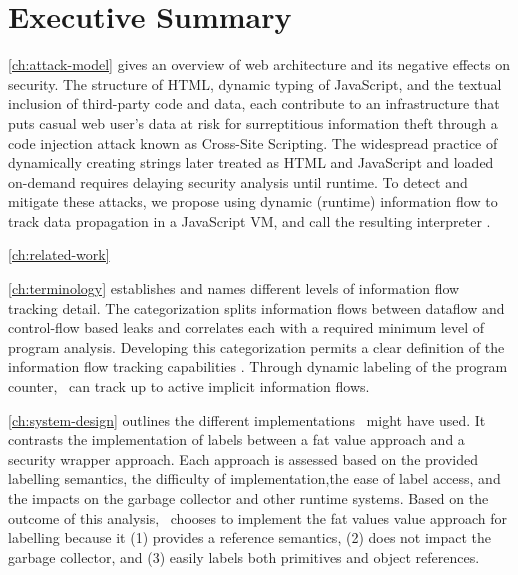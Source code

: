 \section{Executive Summary}

\autoref{ch:attack-model} gives an overview of web architecture and its negative effects on security.
The structure of HTML, dynamic typing of JavaScript, and the textual inclusion of third-party code and data, each contribute to an infrastructure that puts casual web user's data at risk for surreptitious information theft through a code injection attack known as Cross-Site Scripting.
The widespread practice of dynamically creating strings later treated as HTML and JavaScript and loaded on-demand requires delaying security analysis until runtime.
To detect and mitigate these attacks, we propose using dynamic (runtime) information flow to track data propagation in a JavaScript VM, and call the resulting interpreter \FlowCore.

\autoref{ch:related-work} 

\autoref{ch:terminology} establishes and names different levels of information flow tracking detail.
The categorization splits information flows between dataflow and control-flow based leaks and correlates each with a required minimum level of program analysis.
Developing this categorization permits a clear definition of the information flow tracking capabilities \FlowCore.
Through dynamic labeling of the program counter, \FlowCore\ can track up to active implicit information flows.

\autoref{ch:system-design} outlines the different implementations \FlowCore\ might have used.
It contrasts the implementation of labels between a fat value approach and a security wrapper approach.
Each approach is assessed based on the provided labelling semantics, the difficulty of implementation,the ease of label access, and the impacts on the garbage collector and other runtime systems.
Based on the outcome of this analysis, \FlowCore\ chooses to implement the fat values value approach for labelling because it (1) provides a reference semantics, (2) does not impact the garbage collector, and (3) easily labels both primitives and object references.

